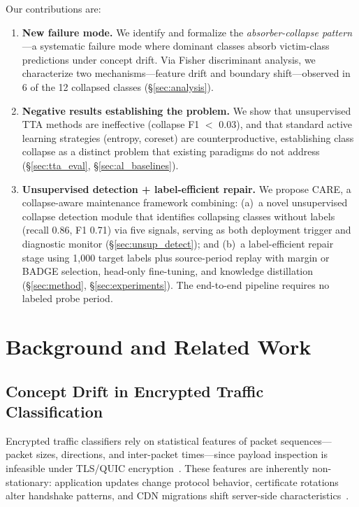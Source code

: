 \documentclass[journal]{IEEEtran}
\newcommand{\ours}{CARE}  %
\begin{document}
Our contributions are:
\begin{enumerate}
  \item \textbf{New failure mode.} We identify and formalize the \textit{absorber-collapse pattern}---a systematic failure mode where dominant classes absorb victim-class predictions under concept drift. Via Fisher discriminant analysis, we characterize two mechanisms---feature drift and boundary shift---observed in 6 of the 12 collapsed classes (\S\ref{sec:analysis}).
  \item \textbf{Negative results establishing the problem.} We show that unsupervised TTA methods are ineffective (collapse F1 $<$ 0.03), and that standard active learning strategies (entropy, coreset) are counterproductive, establishing class collapse as a distinct problem that existing paradigms do not address (\S\ref{sec:tta_eval}, \S\ref{sec:al_baselines}).
  \item \textbf{Unsupervised detection + label-efficient repair.} We propose \ours{}, a collapse-aware maintenance framework combining: (a)~a novel unsupervised collapse detection module that identifies collapsing classes without labels (recall 0.86, F1 0.71) via five signals, serving as both deployment trigger and diagnostic monitor (\S\ref{sec:unsup_detect}); and (b)~a label-efficient repair stage using 1{,}000 target labels plus source-period replay with margin or BADGE selection, head-only fine-tuning, and knowledge distillation (\S\ref{sec:method}, \S\ref{sec:experiments}). The end-to-end pipeline requires no labeled probe period.
\end{enumerate}


\section{Background and Related Work}
\label{sec:related}

\subsection{Concept Drift in Encrypted Traffic Classification}

Encrypted traffic classifiers rely on statistical features of packet sequences---packet sizes, directions, and inter-packet times---since payload inspection is infeasible under TLS/QUIC encryption~\cite{luxemburk2023quic}.
These features are inherently non-stationary: application updates change protocol behavior, certificate rotations alter handshake patterns, and CDN migrations shift server-side characteristics~\cite{soukup2025drift, malekghaini2023drift}.
\end{document}
